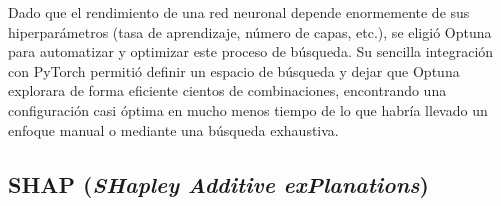 Dado que el rendimiento de una red neuronal depende enormemente de sus hiperparámetros (tasa de aprendizaje, número de capas, etc.), se eligió Optuna para automatizar y optimizar este proceso de búsqueda. Su sencilla integración con PyTorch permitió definir un espacio de búsqueda y dejar que Optuna explorara de forma eficiente cientos de combinaciones, encontrando una configuración casi óptima en mucho menos tiempo de lo que habría llevado un enfoque manual o mediante una búsqueda exhaustiva.

\subsection{SHAP (\textit{SHapley Additive exPlanations})}


